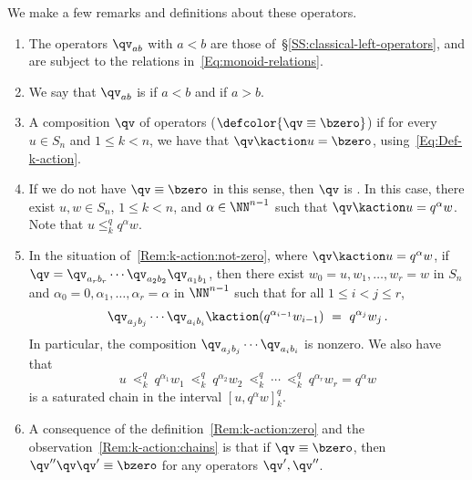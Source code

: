 \begin{remark}\label{Rem:k-action}
We make a few remarks and definitions about these operators.

\begin{enumerate}[label=(\roman*)]
  \item
      The operators $\qv_{ab}$ with $a<b$ are those
      of~\S\ref{SS:classical-left-operators}, and are subject to the
      relations in~\eqref{Eq:monoid-relations}.

  \item
        We say that ${\qv}_{ab}$ is  if $a<b$
        and  if $a>b$.

  \item  \label{Rem:k-action:zero}
    A composition $\qv$ of operators  ($\defcolor{\qv\equiv \bzero}$) if for every $u\in S_n$
    and $1\leq k<n$, we have that $\qv\kaction u= \bzero$, using~\eqref{Eq:Def-k-action}.

  \item  \label{Rem:k-action:not-zero}
    If we do not have $\qv\equiv\bzero$ in this sense, then $\qv$ is .
    In this case, there exist $u,w\in S_n$, $1\leq k<n$, and $\alpha\in\NN^{n-1}$
    such that $\qv\kaction u= q^\alpha w$.
    Note that $u\leq_k^q q^\alpha w$.

  \item  \label{Rem:k-action:chains}
    In the situation of~\ref{Rem:k-action:not-zero}, where $\qv\kaction u=q^\alpha w$, if
    $\qv=\qv_{a_rb_r}\dotsb\qv_{a_2b_2}\qv_{a_1b_1}$, then there exist $w_0=u,w_1,\dotsc,w_r=w$ in $S_n$ and
    $\alpha_0=0, \alpha_1,\dotsc,\alpha_r=\alpha$ in $\NN^{n-1}$ such that for all $1\leq i<j\leq r$,
    \begin{equation}\label{Eq:sub-chain}
      \qv_{a_jb_j} \dotsb \qv_{a_ib_i} \kaction  (q^{\alpha_{i-1}}w_{i-1})\ =\ q^{\alpha_j} w_j\,.
    \end{equation}
    In particular, the composition $\qv_{a_jb_j} \dotsb \qv_{a_ib_i}$ is nonzero.
    We also have that 
    \[
      u\ \lessdot_k^q\ q^{\alpha_1}w_1\ \lessdot_k^q\ q^{\alpha_2}w_2
      \ \lessdot_k^q\ \dotsb\  \lessdot_k^q\ q^{\alpha_r}w_r=q^\alpha w
    \]
    is a saturated chain in the interval $[u,q^\alpha w]_k^q$.

  \item\label{Rem:k-action:zero_compose}
    A consequence of the definition~\ref{Rem:k-action:zero} and the observation~\ref{Rem:k-action:chains} is that if
    $\qv\equiv\bzero$, then $\qv''\qv\qv'\equiv\bzero$ for any operators $\qv',\qv''$.
    

\end{enumerate}
\end{remark}

